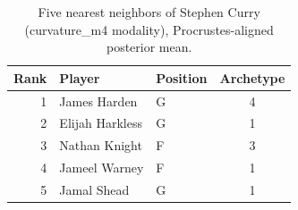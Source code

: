 \begin{table}[htbp]
  \centering\small
  \begin{tabular}{rllc}
    \toprule
    Rank & Player & Position & Archetype \\
    \midrule
    1 & James Harden & G & 4 \\
    2 & Elijah Harkless & G & 1 \\
    3 & Nathan Knight & F & 3 \\
    4 & Jameel Warney & F & 1 \\
    5 & Jamal Shead & G & 1 \\
    \bottomrule
  \end{tabular}
  \caption{Five nearest neighbors of Stephen Curry (curvature_m4 modality), Procrustes-aligned posterior mean.}
  \label{tab:Stephen_Curry_neighbors_curvature_m4}
\end{table}

